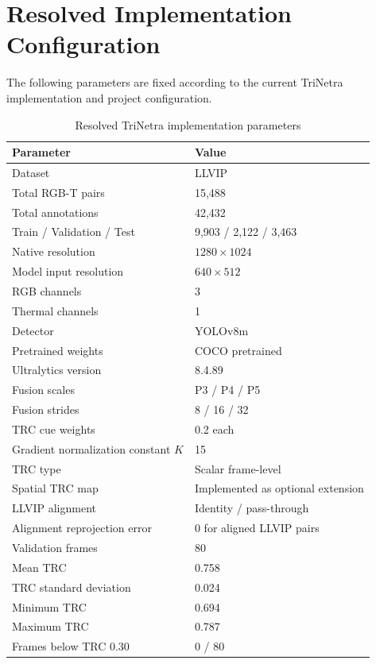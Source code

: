 \documentclass[conference]{IEEEtran}
\begin{document}
\section{Resolved Implementation Configuration}

The following parameters are fixed according to the current TriNetra
implementation and project configuration.

\begin{table}[!t]
\centering
\caption{Resolved TriNetra implementation parameters}
\label{tab:resolvedparams}
\footnotesize
\begin{tabular}{p{}p{}}
\toprule
\textbf{Parameter} & \textbf{Value} \\
\midrule
Dataset & LLVIP \\
Total RGB-T pairs & 15,488 \\
Total annotations & 42,432 \\
Train / Validation / Test & 9,903 / 2,122 / 3,463 \\
Native resolution & $1280\times1024$ \\
Model input resolution & $640\times512$ \\
RGB channels & 3 \\
Thermal channels & 1 \\
Detector & YOLOv8m \\
Pretrained weights & COCO pretrained \\
Ultralytics version & 8.4.89 \\
Fusion scales & P3 / P4 / P5 \\
Fusion strides & 8 / 16 / 32 \\
TRC cue weights & 0.2 each \\
Gradient normalization constant $K$ & 15 \\
TRC type & Scalar frame-level \\
Spatial TRC map & Implemented as optional extension \\
LLVIP alignment & Identity / pass-through \\
Alignment reprojection error & 0 for aligned LLVIP pairs \\
Validation frames & 80 \\
Mean TRC & 0.758 \\
TRC standard deviation & 0.024 \\
Minimum TRC & 0.694 \\
Maximum TRC & 0.787 \\
Frames below TRC 0.30 & 0 / 80 \\

\end{tabular}
\end{table}
\end{document}
